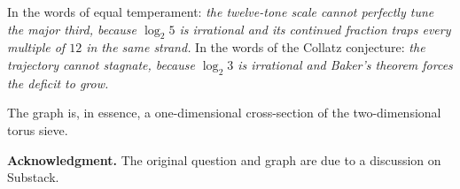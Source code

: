 \documentclass[12pt]{article}
\theoremstyle{plain}
\theoremstyle{definition}
\theoremstyle{remark}
\numberwithin{equation}{section}
\begin{document}
\noindent
In the words of equal temperament: \emph{the twelve-tone scale cannot
perfectly tune the major third, because $\log_2 5$ is irrational and
its continued fraction traps every multiple of $12$ in the same
strand.}  In the words of the Collatz conjecture: \emph{the trajectory
cannot stagnate, because $\log_2 3$ is irrational and Baker's theorem
forces the deficit to grow.}

The graph is, in essence, a one-dimensional cross-section of the
two-dimensional torus sieve.

\bigskip\noindent
\textbf{Acknowledgment.}  The original question and graph are due to
a discussion on Substack.
\end{document}

